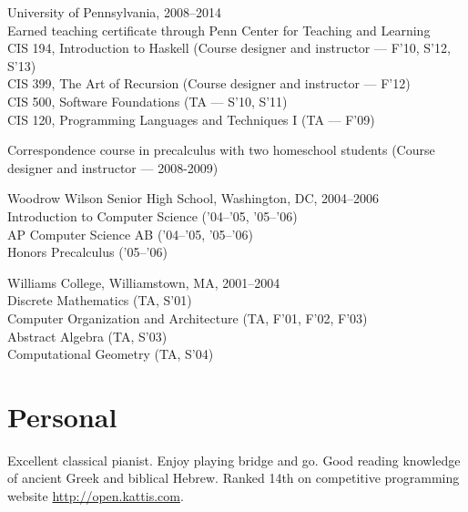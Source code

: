 \documentclass[12pt]{article}
\newcommand{\cvitem}{\par\hangpara{2em}{1}}
\begin{document}
\cvitem
University of Pennsylvania, 2008--2014 \\
Earned teaching certificate through Penn Center for Teaching and
Learning \\
CIS 194, Introduction to Haskell (Course designer and instructor ---
F'10, S'12, S'13) \\
CIS 399, The Art of Recursion (Course designer and instructor ---
F'12) \\
CIS 500, Software Foundations (TA --- S'10, S'11) \\
CIS 120, Programming Languages and Techniques I (TA --- F'09)

\cvitem
Correspondence course in precalculus with two homeschool students
(Course designer and instructor --- 2008-2009)

\cvitem
Woodrow Wilson Senior High School, Washington, DC, 2004--2006 \\
Introduction to Computer Science ('04--'05, '05--'06) \\
AP Computer Science AB ('04--'05, '05--'06) \\
Honors Precalculus ('05--'06)

\cvitem
Williams College, Williamstown, MA, 2001--2004 \\
Discrete Mathematics (TA, S'01) \\
Computer Organization and Architecture (TA, F'01, F'02, F'03) \\
Abstract Algebra (TA, S'03) \\
Computational Geometry (TA, S'04) \\




\section*{Personal}

Excellent classical pianist.  Enjoy playing bridge and go.  Good
reading knowledge of ancient Greek and biblical Hebrew.  Ranked 14th
on competitive programming website \url{http://open.kattis.com}.
\end{document}
